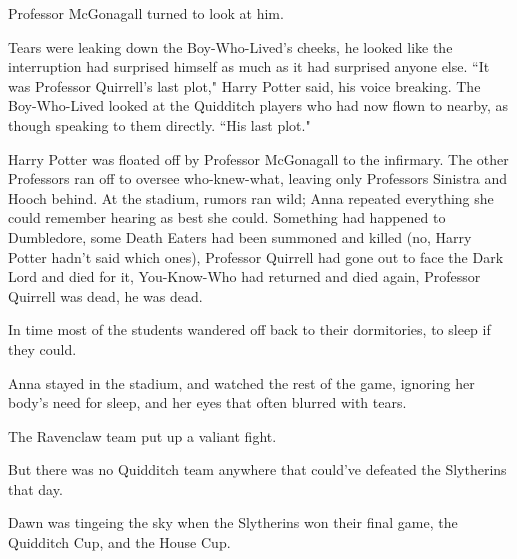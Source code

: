 Professor McGonagall turned to look at him.

Tears were leaking down the Boy-Who-Lived's cheeks, he looked like the interruption had surprised himself as much as it had surprised anyone else. ``It was Professor Quirrell's last plot," Harry Potter said, his voice breaking. The Boy-Who-Lived looked at the Quidditch players who had now flown to nearby, as though speaking to them directly. ``His last plot."

Harry Potter was floated off by Professor McGonagall to the infirmary. The other Professors ran off to oversee who-knew-what, leaving only Professors Sinistra and Hooch behind. At the stadium, rumors ran wild; Anna repeated everything she could remember hearing as best she could. Something had happened to Dumbledore, some Death Eaters had been summoned and killed (no, Harry Potter hadn't said which ones), Professor Quirrell had gone out to face the Dark Lord and died for it, You-Know-Who had returned and died again, Professor Quirrell was dead, he was dead.

In time most of the students wandered off back to their dormitories, to sleep if they could.

Anna stayed in the stadium, and watched the rest of the game, ignoring her body's need for sleep, and her eyes that often blurred with tears.

The Ravenclaw team put up a valiant fight.

But there was no Quidditch team anywhere that could've defeated the Slytherins that day.

Dawn was tingeing the sky when the Slytherins won their final game, the Quidditch Cup, and the House Cup.

